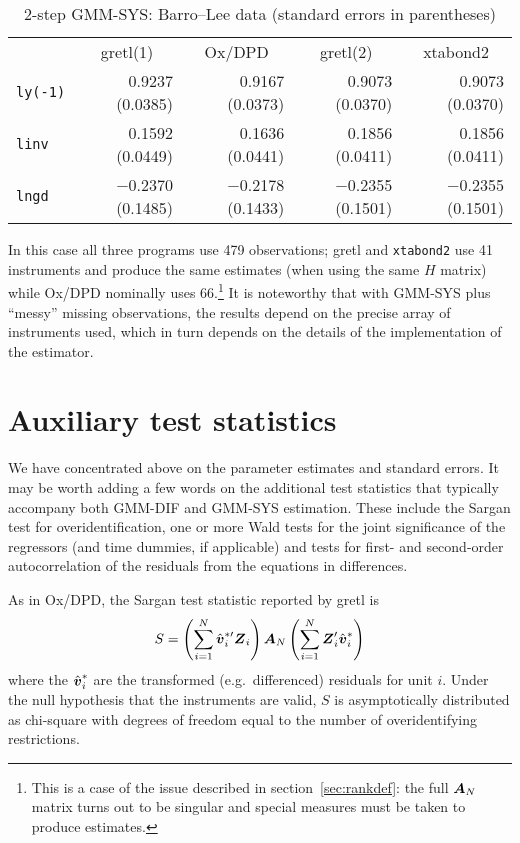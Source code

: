\begin{table}[htbp]
\begin{center}
\begin{tabular}{lrrrr}
& \multicolumn{1}{c}{gretl(1)} & 
  \multicolumn{1}{c}{Ox/DPD} &
  \multicolumn{1}{c}{gretl(2)} & 
  \multicolumn{1}{c}{xtabond2} \\
\texttt{ly(-1)} & 0.9237 (0.0385) & 
  0.9167 (0.0373) & 
    0.9073 (0.0370) &
      0.9073 (0.0370) \\
\texttt{linv} & 0.1592 (0.0449) & 
  0.1636 (0.0441) & 
    0.1856 (0.0411) &
      0.1856 (0.0411) \\
\texttt{lngd} & $-$0.2370 (0.1485) & 
  $-$0.2178 (0.1433) & 
    $-$0.2355 (0.1501) &
      $-$0.2355 (0.1501) 
\end{tabular}
\caption{2-step GMM-SYS: Barro--Lee data (standard errors in parentheses)}
\label{tab:growth-SYS}
\end{center}
\end{table}

In this case all three programs use 479 observations; gretl and
\texttt{xtabond2} use 41 instruments and produce the same estimates
(when using the same $H$ matrix) while Ox/DPD nominally uses
66.\footnote{This is a case of the issue described in
  section~\ref{sec:rankdef}: the full $\boldsymbol{A}_N$ matrix turns out to be
  singular and special measures must be taken to produce estimates.}
It is noteworthy that with GMM-SYS plus ``messy'' missing
observations, the results depend on the precise array of instruments
used, which in turn depends on the details of the implementation of
the estimator.

\section{Auxiliary test statistics}

We have concentrated above on the parameter estimates and standard
errors. It may be worth adding a few words on the additional test
statistics that typically accompany both GMM-DIF and GMM-SYS
estimation. These include the Sargan test for overidentification, one
or more Wald tests for the joint significance of the regressors (and time
dummies, if applicable) and tests for first- and second-order
autocorrelation of the residuals from the equations in differences.

As in Ox/DPD, the Sargan test statistic reported by gretl is
\[
  S = \left(\sum_{i=1}^N \hat{\boldsymbol{v}}^{*\prime}_i \boldsymbol{Z}_i\right)  
   \boldsymbol{A}_N \left(\sum_{i=1}^N \boldsymbol{Z}_i' \hat{\boldsymbol{v}}^*_i\right)
\]
where the $\hat{\boldsymbol{v}}^*_i$ are the transformed (e.g.\ differenced)
residuals for unit $i$.  Under the null hypothesis that the
instruments are valid, $S$ is asymptotically distributed as chi-square
with degrees of freedom equal to the number of overidentifying
restrictions.

